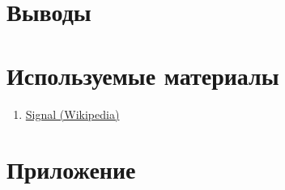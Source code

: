 \documentclass[a4paper,14pt]{extarticle}
\begin{document}
\section{Выводы}

\section{Используемые материалы}

\begin{enumerate}

\item \href{https://en.wikipedia.org/wiki/Signal}{Signal (Wikipedia)}

\end{enumerate}

\section{Приложение}

%
\end{document}

